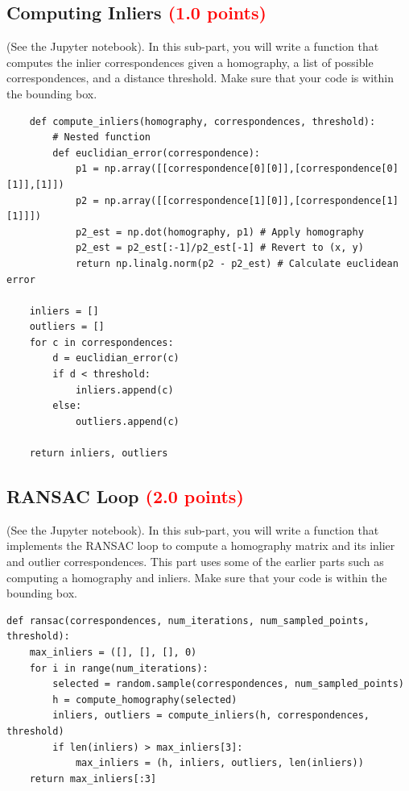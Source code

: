 \documentclass[answers]{exam}
\newcommand{\mypoints}[1]{\textcolor{red}{(#1 points)}}
\begin{document}
\subsection{Computing Inliers \mypoints{1.0}}
(See the Jupyter notebook). In this sub-part, you will write a function that computes the inlier correspondences given a homography, a list of possible correspondences, and a distance threshold. Make sure that your code is within the bounding box.

\begin{solution}
    \begin{verbatim}
    def compute_inliers(homography, correspondences, threshold):
        # Nested function
        def euclidian_error(correspondence):
            p1 = np.array([[correspondence[0][0]],[correspondence[0][1]],[1]])
            p2 = np.array([[correspondence[1][0]],[correspondence[1][1]]])
            p2_est = np.dot(homography, p1) # Apply homography
            p2_est = p2_est[:-1]/p2_est[-1] # Revert to (x, y)
            return np.linalg.norm(p2 - p2_est) # Calculate euclidean error

    inliers = []
    outliers = []
    for c in correspondences:
        d = euclidian_error(c)
        if d < threshold:
            inliers.append(c)
        else:
            outliers.append(c)

    return inliers, outliers
    \end{verbatim}
    \end{solution}

\subsection{RANSAC Loop \mypoints{2.0}}
(See the Jupyter notebook). In this sub-part, you will write a function that implements the RANSAC loop to compute a homography matrix and its inlier and outlier correspondences. This part uses some of the earlier parts such as computing a homography and inliers. Make sure that your code is within the bounding box.

\begin{solution}
    \begin{verbatim}
def ransac(correspondences, num_iterations, num_sampled_points, threshold):
    max_inliers = ([], [], [], 0)
    for i in range(num_iterations):
        selected = random.sample(correspondences, num_sampled_points)
        h = compute_homography(selected)
        inliers, outliers = compute_inliers(h, correspondences, threshold)
        if len(inliers) > max_inliers[3]:
            max_inliers = (h, inliers, outliers, len(inliers))
    return max_inliers[:3]
    \end{verbatim}
    \end{solution}
\end{document}
